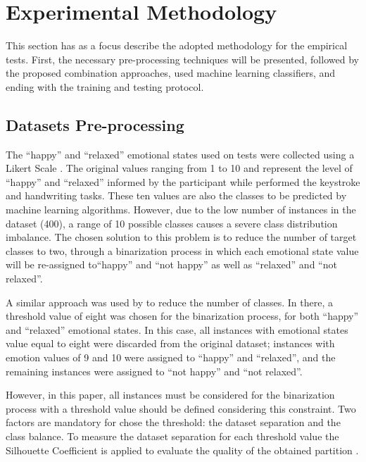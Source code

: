 \documentclass[conference]{IEEEtran}
\begin{document}
\section{Experimental Methodology}

This section has as a focus describe the adopted methodology for the empirical tests. First, the necessary pre-processing techniques will be 
presented, followed by the proposed combination approaches, used machine learning classifiers, and ending with the training and testing protocol. 

\subsection{Datasets Pre-processing}

The ``happy'' and ``relaxed'' emotional states used on tests were collected using a Likert Scale \cite{likert}. The original values ranging from 1 to 10 and represent the level of ``happy'' and ``relaxed''  informed by the participant while performed the keystroke and handwriting tasks. These ten values are also the classes to be predicted by machine learning algorithms.
However, due to the low number of instances in the dataset (400), a range of 10 possible classes causes a severe class distribution imbalance. The chosen solution to this problem is to reduce the number of target classes to two, through a binarization process in which each emotional state value will be re-assigned to``happy'' and ``not happy'' as well as ``relaxed'' and ``not relaxed''. 

A similar approach was used by \cite{cheng-thesis} to reduce the number of classes. In there, a threshold value of eight was chosen for the binarization process, for both ``happy'' and ``relaxed'' emotional states. In this case, all instances with emotional states value equal to eight were discarded from the original dataset; instances with emotion values of 9 and 10 were assigned to ``happy'' and ``relaxed'', and the remaining instances were assigned to ``not happy'' and ``not relaxed''.

However, in this paper, all instances must be considered for the binarization process with a  threshold value should be defined considering this constraint. Two factors are mandatory for chose the threshold: the dataset separation and the class balance. To measure the dataset separation for each threshold value the Silhouette Coefficient is applied to evaluate the quality of the obtained partition \cite{silhouettes}. 
\end{document}
